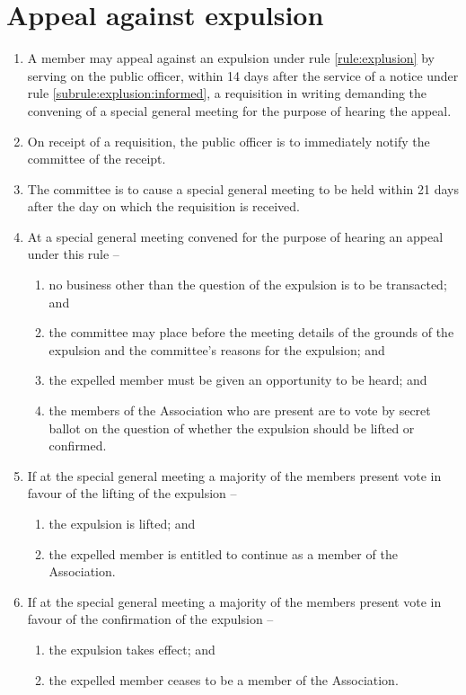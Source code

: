 \documentclass[a4paper,11pt]{article}
\begin{document}
\section{Appeal against expulsion}
\label{rule:appeal}

\begin{enumerate}
	\item A member may appeal against an expulsion under rule \ref{rule:explusion} by serving on the public officer, within 14 days after the service of a notice under rule \ref{subrule:explusion:informed}, a requisition in writing demanding the convening of a special general meeting for the purpose of hearing the appeal.
	\item On receipt of a requisition, the public officer is to immediately notify the committee of the receipt.
	\item The committee is to cause a special general meeting to be held within 21 days after the day on which the requisition is received.

	\item At a special general meeting convened for the purpose of hearing an appeal under this rule --
	\begin{enumerate}
		\item no business other than the question of the expulsion is to be transacted; and
		\item the committee may place before the meeting details of the grounds of the expulsion and the committee's reasons for the expulsion; and
		\item the expelled member must be given an opportunity to be heard; and
		\item the members of the Association who are present are to vote by secret ballot on the question of whether the expulsion should be lifted or confirmed.
	\end{enumerate}

	\item If at the special general meeting a majority of the members present vote in favour of the lifting of the expulsion --
	\begin{enumerate}
		\item the expulsion is lifted; and
		\item the expelled member is entitled to continue as a member of the Association.
	\end{enumerate}
	
	\item If at the special general meeting a majority of the members present vote in favour of the confirmation of the expulsion --
	\begin{enumerate}
		\item the expulsion takes effect; and
		\item the expelled member ceases to be a member of the Association.
	\end{enumerate}
\end{enumerate}
\end{document}
